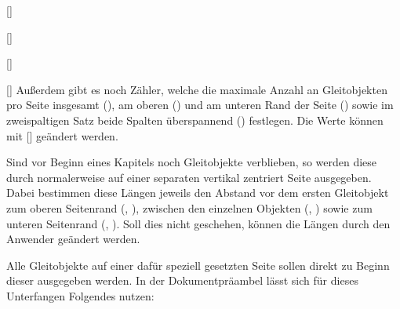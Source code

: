 \begin{Declaration}{}[]
\begin{Declaration}{}[]
\begin{Declaration}{}[]
\begin{Declaration}{}[]
\printdeclarationlist%
%
Außerdem gibt es noch Zähler, welche die maximale Anzahl an Gleitobjekten pro 
Seite insgesamt (), am oberen () und 
am unteren Rand der Seite () sowie im zweispaltigen Satz
beide Spalten überspannend () festlegen. Die Werte 
können mit [] geändert 
werden.
\end{Declaration}
\end{Declaration}
\end{Declaration}
\end{Declaration}

\begin{Declaration}{}
\begin{Declaration}{}
\begin{Declaration}{}
\begin{Declaration}{}
\begin{Declaration}{}
\begin{Declaration}{}
\printdeclarationlist%
%
Sind vor Beginn eines Kapitels noch Gleitobjekte verblieben, so werden diese 
durch  normalerweise auf einer separaten vertikal zentriert Seite 
ausgegeben. Dabei bestimmen diese Längen jeweils den Abstand vor dem ersten 
Gleitobjekt zum oberen Seitenrand (, ), 
zwischen den einzelnen Objekten (, ) sowie 
zum unteren Seitenrand (, ). Soll dies nicht 
geschehen, können die Längen durch den Anwender geändert werden.
\end{Declaration}
\end{Declaration}
\end{Declaration}
\end{Declaration}
\end{Declaration}
\end{Declaration}
%
\begin{Example}
Alle Gleitobjekte auf einer dafür speziell gesetzten Seite sollen direkt zu 
Beginn dieser ausgegeben werden. In der Dokumentpräambel lässt sich für dieses 
Unterfangen Folgendes nutzen:
\begin{Code}
\makeatletter
\setlength{\@fptop}{0pt}
\setlength{\@dblfptop}{0pt}%
\makeatother
\end{Code}
\end{Example}



